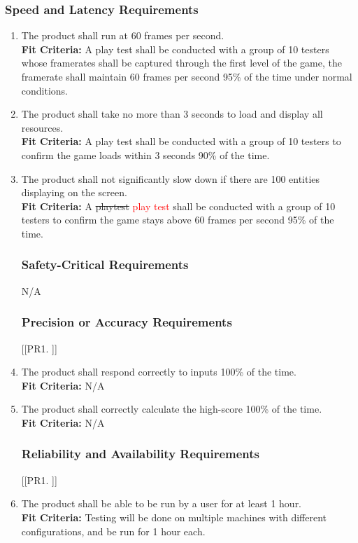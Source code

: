 \documentclass[12pt, titlepage]{article}
\begin{document}
\subsubsection{Speed and Latency Requirements}
\begin{enumerate}[{PR}1. ]
    \item The product shall run at 60 frames per second.\\
    \textbf{Fit Criteria:} A play test shall be conducted with a group of 10 testers whose framerates shall be captured through the first level of the game, the framerate shall maintain 60 frames per second 95\% of the time under normal conditions.
    \item The product shall take no more than 3 seconds to load and display all resources.\\
    \textbf{Fit Criteria:} A play test shall be conducted with a group of 10 testers to confirm the game loads within 3 seconds 90\% of the time.
    \item The product shall not significantly slow down if there are 100 entities displaying on the screen.\\
    \textbf{Fit Criteria:} A \sout{playtest} \textcolor{red}{play test} shall be conducted with a group of 10 testers to confirm the game stays above 60 frames per second 95\% of the time.

\subsubsection{Safety-Critical Requirements}
N/A

\subsubsection{Precision or Accuracy Requirements}
[{[{PR}1. ]}]
    \item The product shall respond correctly to inputs 100\% of the time.\\
    \textbf{Fit Criteria:} N/A
    \item The product shall correctly calculate the high-score 100\% of the time.\\
    \textbf{Fit Criteria:} N/A

\subsubsection{Reliability and Availability Requirements}
[{[{PR}1. ]}]
    \item The product shall be able to be run by a user for at least 1 hour.\\
    \textbf{Fit Criteria:} Testing will be done on multiple machines with different configurations, and be run for 1 hour each.


\end{enumerate}
\end{document}

